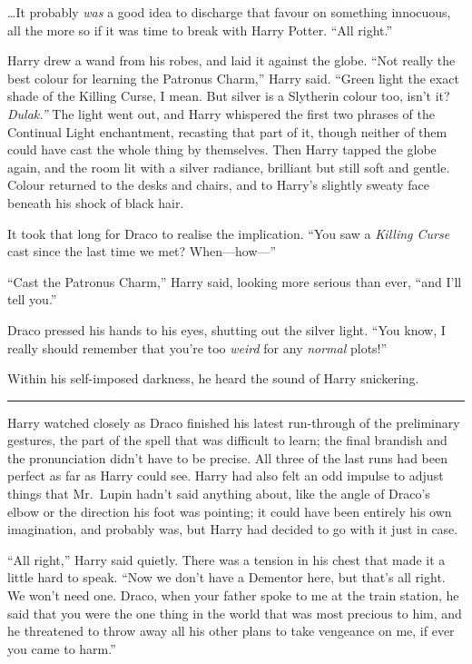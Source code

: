 \ldots{}It probably \emph{was} a good idea to discharge that favour on
something innocuous, all the more so if it was time to break with Harry
Potter. ``All right.''

Harry drew a wand from his robes, and laid it against the globe. ``Not
really the best colour for learning the Patronus Charm,'' Harry said.
``Green light the exact shade of the Killing Curse, I mean. But silver
is a Slytherin colour too, isn't it? \emph{Dulak.''} The light went out,
and Harry whispered the first two phrases of the Continual Light
enchantment, recasting that part of it, though neither of them could
have cast the whole thing by themselves. Then Harry tapped the globe
again, and the room lit with a silver radiance, brilliant but still soft
and gentle. Colour returned to the desks and chairs, and to Harry's
slightly sweaty face beneath his shock of black hair.

It took that long for Draco to realise the implication. ``You saw a
\emph{Killing Curse} cast since the last time we met? When---how---''

``Cast the Patronus Charm,'' Harry said, looking more serious than ever,
``and I'll tell you.''

Draco pressed his hands to his eyes, shutting out the silver light.
``You know, I really should remember that you're too \emph{weird} for
any \emph{normal} plots!''

Within his self-imposed darkness, he heard the sound of Harry
snickering.

\begin{center}\rule{3in}{0.4pt}\end{center}

Harry watched closely as Draco finished his latest run-through of the
preliminary gestures, the part of the spell that was difficult to learn;
the final brandish and the pronunciation didn't have to be precise. All
three of the last runs had been perfect as far as Harry could see. Harry
had also felt an odd impulse to adjust things that Mr.~Lupin hadn't said
anything about, like the angle of Draco's elbow or the direction his
foot was pointing; it could have been entirely his own imagination, and
probably was, but Harry had decided to go with it just in case.

``All right,'' Harry said quietly. There was a tension in his chest that
made it a little hard to speak. ``Now we don't have a Dementor here, but
that's all right. We won't need one. Draco, when your father spoke to me
at the train station, he said that you were the one thing in the world
that was most precious to him, and he threatened to throw away all his
other plans to take vengeance on me, if ever you came to harm.''

